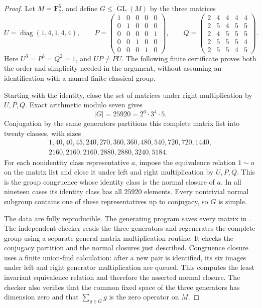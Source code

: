 \begin{proof}
Let $M=\mathbf F_7^5$, and define $G\le\operatorname{GL}(M)$
by the three matrices
\[
 U=\operatorname{diag}(1,4,1,4,4),\qquad
 P=\begin{pmatrix}
 1&0&0&0&0\\
 0&1&0&0&0\\
 0&0&0&0&1\\
 0&0&1&0&0\\
 0&0&0&1&0
 \end{pmatrix},\qquad
 Q=\begin{pmatrix}
 2&4&4&4&4\\
 2&5&4&5&5\\
 2&4&5&5&5\\
 2&5&5&5&4\\
 2&5&5&4&5
 \end{pmatrix}.                                                \tag{B.NA.1}
\]
Here $U^3=P^3=Q^2=1$, and $UP\ne PU$.
The following finite certificate proves both the order and
simplicity needed in the argument, without assuming an
identification with a named finite classical group.

Starting with the identity, close the set of matrices under
right multiplication by $U,P,Q$. Exact arithmetic modulo
seven gives
\[
                        |G|=25920=2^6\cdot3^4\cdot5.
\]
Conjugation by the same generators partitions this complete
matrix list into twenty classes, with sizes
\[
\begin{gathered}
 1,40,40,45,240,270,360,360,480,540,720,720,1440,\\
                   2160,2160,2160,2880,2880,3240,5184.
\end{gathered}                                                   \tag{B.NA.2}
\]
For each nonidentity class representative $a$, impose the
equivalence relation $1\sim a$ on the matrix list and close
it under left and right multiplication by $U,P,Q$. This is
the group congruence whose identity class is the normal
closure of $a$. In all nineteen cases its identity class
has all $25920$ elements. Every nontrivial normal subgroup
contains one of these representatives up to conjugacy, so
$G$ is simple.

The data are fully reproducible. The generating program saves
every matrix in
. The independent
checker  reads
the three generators and regenerates the complete group using
a separate general matrix multiplication routine. It checks
the conjugacy partition and the normal closures just described.
Congruence closure uses a finite union-find calculation: after
a new pair is identified, its six images under left and right
generator multiplication are queued. This computes the least
invariant equivalence relation and therefore the asserted
normal closure. The checker also verifies that the common
fixed space of the three generators has dimension zero and
that $\sum_{g\in G}g$ is the zero operator on $M$.


\end{proof}
